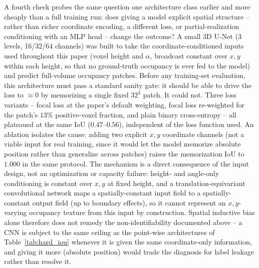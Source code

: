 \documentclass[aip,amsmath,amssymb,reprint]{revtex4-1}
\renewcommand{\ang}{\ensuremath{\alpha}} %
\begin{document}
A fourth check probes the same question one architecture class earlier and
more cheaply than a full training run: does giving a model explicit spatial
structure -- rather than richer coordinate encoding, a different loss, or
partial-realization conditioning with an MLP head -- change the outcome? A
small 3D U-Net (3 levels, 16/32/64 channels) was built to take the
coordinate-conditioned inputs used throughout this paper (voxel height and
$\ang$, broadcast constant over $x,y$ within each height, so that no ground-truth
occupancy is ever fed to the model) and predict full-volume occupancy patches.
Before any training-set evaluation, this architecture must pass a standard
sanity gate: it should be able to drive the loss to $\approx 0$ by memorizing
a single fixed $32^3$ patch. It could not. Three loss variants -- focal loss
at the paper's default weighting, focal loss re-weighted for the patch's
$13\%$ positive-voxel fraction, and plain binary cross-entropy -- all
plateaued at the same IoU ($0.47$--$0.56$), independent of the loss function
used. An ablation isolates the cause: adding two explicit $x,y$ coordinate
channels (not a viable input for real training, since it would let the model
memorize absolute position rather than generalize across patches) raises the
memorization IoU to $1.000$ in the same protocol. The mechanism is a direct
consequence of the input design, not an optimization or capacity failure:
height- and angle-only conditioning is constant over $x,y$ at fixed height, and
a translation-equivariant convolutional network maps a spatially-constant
input field to a spatially-constant output field (up to boundary effects),
so it cannot represent an $x,y$-varying occupancy texture from this input by
construction. Spatial inductive bias alone therefore does not remedy the
non-identifiability documented above -- a CNN is subject to the same ceiling
as the point-wise architectures of Table~\ref{tab:hard_iou} whenever it is
given the same coordinate-only information, and giving it more (absolute
position) would trade the diagnosis for label leakage rather than resolve it.
\end{document}
